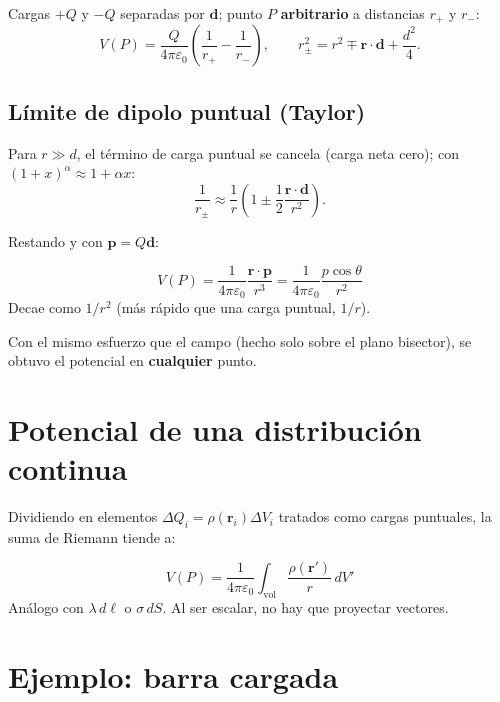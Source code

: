 \documentclass[12pt,a4paper]{article}
\begin{document}
Cargas $+Q$ y $-Q$ separadas por $\mathbf{d}$; punto $P$
\textbf{arbitrario} a distancias $r_+$ y $r_-$:
\[
V(P) = \frac{Q}{4\pi\varepsilon_0}\left(\frac{1}{r_+} - \frac{1}{r_-}\right),
\qquad
r_\pm^2 = r^2 \mp \mathbf{r}\cdot\mathbf{d} + \frac{d^2}{4}.
\]

\subsection{Límite de dipolo puntual (Taylor)}

Para $r \gg d$, el término de carga puntual se cancela (carga neta cero);
con $(1+x)^\alpha \approx 1+\alpha x$:
\[
\frac{1}{r_\pm} \approx \frac{1}{r}\left(1 \pm \frac{1}{2}\frac{\mathbf{r}\cdot\mathbf{d}}{r^2}\right).
\]

Restando y con $\mathbf{p} = Q\mathbf{d}$:

\begin{keybox}
  \[
  \boxed{V(P) = \frac{1}{4\pi\varepsilon_0}\frac{\mathbf{r}\cdot\mathbf{p}}{r^3}
        = \frac{1}{4\pi\varepsilon_0}\frac{p\cos\theta}{r^2}}
  \]
  Decae como $1/r^2$ (más rápido que una carga puntual, $1/r$).
\end{keybox}

Con el mismo esfuerzo que el campo (hecho solo sobre el plano bisector),
se obtuvo el potencial en \textbf{cualquier} punto.

\section{Potencial de una distribución continua}

Dividiendo en elementos $\Delta Q_i = \rho(\mathbf{r}_i)\Delta V_i$
tratados como cargas puntuales, la suma de Riemann tiende a:

\begin{keybox}
  \[
  \boxed{V(P) = \frac{1}{4\pi\varepsilon_0}\int_{\text{vol}}
         \frac{\rho(\mathbf{r}')}{r}\, dV'}
  \]
  Análogo con $\lambda\,d\ell$ o $\sigma\,dS$. Al ser escalar, no hay que
  proyectar vectores.
\end{keybox}

\section{Ejemplo: barra cargada}
\end{document}
